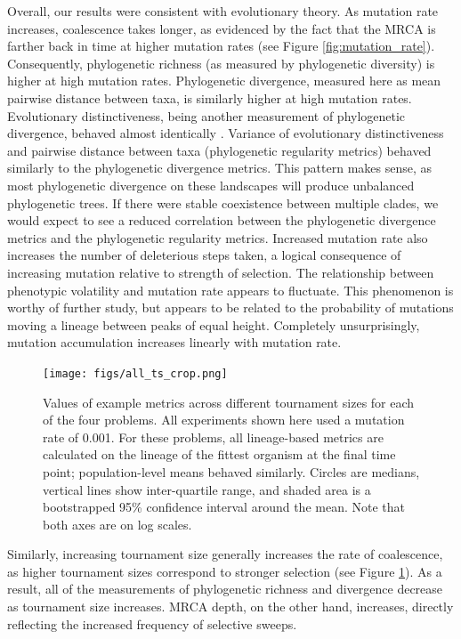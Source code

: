 \documentclass[letterpaper]{article}
\newcommand{\reduceCaptionPadding}{\setlength{\belowcaptionskip}{-10pt}}
\begin{document}
Overall, our results were consistent with evolutionary theory. As mutation rate increases, coalescence takes longer, as evidenced by the fact that the MRCA is farther back in time at higher mutation rates (see Figure \ref{fig:mutation_rate}). Consequently, phylogenetic richness (as measured by phylogenetic diversity) is higher at high mutation rates. Phylogenetic divergence, measured here as mean pairwise distance between taxa, is similarly higher at high mutation rates. Evolutionary distinctiveness, being another measurement of phylogenetic divergence, behaved almost identically \citep{zenodo_supplement}. Variance of evolutionary distinctiveness and pairwise distance between taxa (phylogenetic regularity metrics) behaved similarly to the phylogenetic divergence metrics. This pattern makes sense, as most phylogenetic divergence on these landscapes will produce unbalanced phylogenetic trees. If there were stable coexistence between multiple clades, we would expect to see a reduced correlation between the phylogenetic divergence metrics and the phylogenetic regularity metrics. Increased mutation rate also increases the number of deleterious steps taken, a logical consequence of increasing mutation relative to strength of selection. The relationship between phenotypic volatility and mutation rate appears to fluctuate. This phenomenon is worthy of further study, but appears to be related to the probability of mutations moving a lineage between peaks of equal height. Completely unsurprisingly, mutation accumulation increases linearly with mutation rate.

\begin{figure}
\centering
\texttt{[image: figs/all\_ts\_crop.png]}
\reduceCaptionPadding
\caption{\small Values of example metrics across different tournament sizes for each of the four problems. All experiments shown here used a mutation rate of 0.001. For these problems, all lineage-based metrics are calculated on the lineage of the fittest organism at the final time point; population-level means behaved similarly. Circles are medians, vertical lines show inter-quartile range, and shaded area is a bootstrapped 95\% confidence interval around the mean. Note that both axes are on log scales.}
\label{fig:ts}
\end{figure}

Similarly, increasing tournament size generally increases the rate of coalescence, as higher tournament sizes correspond to stronger selection (see Figure \ref{fig:ts}). As a result, all of the measurements of phylogenetic richness and divergence decrease as tournament size increases. MRCA depth, on the other hand, increases, directly reflecting the increased frequency of selective sweeps. 
\end{document}

